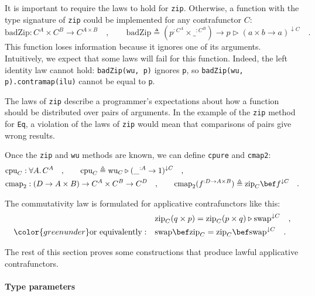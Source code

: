 It is important to require the laws to hold for \lstinline!zip!.
Otherwise, a function with the type signature of \lstinline!zip!
could be implemented for any contrafunctor $C$:
\[
\text{badZip}:C^{A}\times C^{B}\rightarrow C^{A\times B}\quad,\quad\quad\text{badZip}\triangleq(p^{:C^{A}}\times\_^{:C^{B}})\rightarrow p\triangleright(a\times b\rightarrow a)^{\downarrow C}\quad.
\]
This function loses information because it ignores one of its arguments.
Intuitively, we expect that some laws will fail for this function.
Indeed, the left identity law cannot hold: \lstinline!badZip(wu, p)!
ignores \lstinline!p!, so \lstinline!badZip(wu, p).contramap(ilu)!
cannot be equal to \lstinline!p!.

The laws of \lstinline!zip! describe a programmer\textsf{'}s expectations
about how a function should be distributed over pairs of arguments.
In the example of the \lstinline!zip! method for \lstinline!Eq!,
a violation of the laws of \lstinline!zip! would mean that comparisons
of pairs give wrong results.

Once the \lstinline!zip! and \lstinline!wu! methods are known, we
can define \lstinline!cpure! and \lstinline!cmap2!:
\begin{align*}
 & \text{cpu}_{C}:\forall A.\,C^{A}\quad,\quad\quad\text{cpu}_{C}\triangleq\text{wu}_{C}\triangleright(\_^{:A}\rightarrow1)^{\downarrow C}\quad,\\
 & \text{cmap}_{2}:(D\rightarrow A\times B)\rightarrow C^{A}\times C^{B}\rightarrow C^{D}\quad,\quad\quad\text{cmap}_{2}(f^{:D\rightarrow A\times B})\triangleq\text{zip}_{C}\bef f^{\downarrow C}\quad.
\end{align*}

The commutativity law is formulated for applicative contrafunctors
like this:
\begin{align*}
 & \text{zip}_{C}(q\times p)=\text{zip}_{C}(p\times q)\triangleright\text{swap}^{\downarrow C}\quad,\\
{\color{greenunder}\text{or equivalently}:}\quad & \text{swap}\bef\text{zip}_{C}=\text{zip}_{C}\bef\text{swap}^{\downarrow C}\quad.
\end{align*}

The rest of this section proves some constructions that produce lawful
applicative contrafunctors.

\paragraph{Type parameters}

